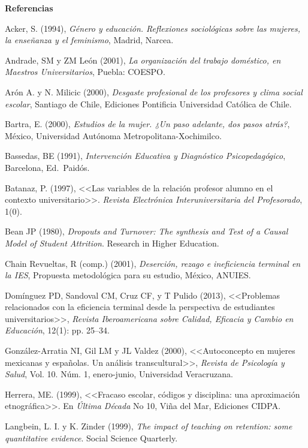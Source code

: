 \textbf{Referencias}

\medskip 
Acker, S. (1994), \textit{Género y educación.
Reflexiones sociológicas sobre las mujeres, la enseñanza y el feminismo},
Madrid, Narcea.

 
Andrade, SM y ZM León (2001), \textit{La organización del trabajo doméstico,
en Maestros Universitarios}, Puebla: COESPO.

 
Arón A. y N. Milicic (2000), \textit{Desgaste profesional de los profesores y
clima social escolar}, Santiago de Chile, Ediciones Pontiﬁcia Universidad Católica de Chile.

Bartra, E. (2000), \textit{Estudios de la
mujer. ¿Un paso adelante, dos pasos atrás?},
México, Universidad Autónoma Metropolitana-Xochimilco.

 
Bassedas, BE (1991), \textit{Intervención Educativa y Diagnóstico
Psicopedagógico}, Barcelona,  Ed.\ Paidós.

 
Batanaz, P. (1997), <<Las variables de la relación profesor alumno en el
contexto universitario>>. \textit{Revista Electrónica Interuniversitaria del
Profesorado}, 1(0).

 
Bean JP (1980), \textit{Dropouts and Turnover: The synthesis and Test of a Causal
Model of Student Attrition}. Research in Higher Education.

\begin{sloppypar} 
Chain Revueltas, R (comp.) (2001), \textit{Deserción, rezago e ineficiencia
terminal en la IES}, Propuesta metodológica para su estudio, México,
ANUIES.
\end{sloppypar} 
 
Domínguez PD, Sandoval CM, Cruz CF, y T Pulido (2013), <<Problemas
relacionados con la eficiencia terminal desde la perspectiva de estudiantes
universitarios>>, \textit{Revista Iberoamericana sobre Calidad, Eficacia y
Cambio en Educación}, 12(1): pp. 25--34.
\newpage
 
González-Arratia NI, Gil LM y JL Valdez (2000), <<Autoconcepto en mujeres
mexicanas y españolas. Un análisis transcultural>>, \textit{Revista de
Psicología y Salud}, Vol. 10. Núm. 1, enero-junio, Universidad
Veracruzana.

 
Herrera, ME. (1999), <<Fracaso escolar, códigos y disciplina: una
aproximación etnográfica>>. En \textit{Última Década} No 10, Viña del Mar,
Ediciones CIDPA.

 
Langbein, L. I. y K. Zinder (1999), \textit{The impact of teaching on
retention: some quantitative evidence}. Social Science Quarterly.

